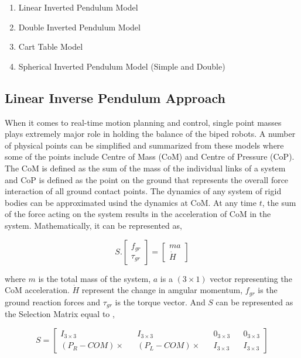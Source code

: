 \begin{enumerate}
    \item Linear Inverted Pendulum Model
    \item Double Inverted Pendulum Model
    \item Cart Table Model
    \item Spherical Inverted Pendulum Model (Simple and Double)
\end{enumerate}


\subsection{Linear Inverse Pendulum Approach}

When it comes to real-time motion planning and control, single point masses plays extremely major role in holding the balance of the biped robots. A number of physical points can be simplified and summarized from 
these models where some of the points include Centre of Mass (CoM) and Centre of Pressure (CoP). The CoM is defined as the sum of the mass of the individual links of a system and CoP is defined as the point on the 
ground that represents the overall force interaction of all ground contact points. The dynamics of any system of rigid bodies can be approximated usind the dynamics at CoM. At any time $t$, the sum of the force acting 
on the system results in the acceleration of CoM in the system. Mathematically, it can be represented as,


\begin{equation}
    S.\begin{bmatrix}
        f_{gr} \\
        \tau_{gr}
    \end{bmatrix} = 
    \begin{bmatrix}
        ma \\
        \dot{H}
    \end{bmatrix}
\end{equation}


where $m$ is the total mass of the system, $a$ is a $(3 \times 1)$ vector representing the CoM acceleration. $\dot{H}$ represent the change in amgular momentum, $f_{gr}$ is the ground reaction forces and $\tau_{gr}$ is the torque vector. And $S$ can be represented as the 
Selection Matrix equal to \cite{elhasairi2015humanoid}, 


\begin{equation}
    S = \begin{bmatrix}
        I_{3 \times 3} && I_{3 \times 3} && 0_{3 \times 3} && 0_{3 \times 3} \\
        (P_R - COM)\times && (P_L - COM)\times && I_{3 \times 3} && I_{3 \times 3}
    \end{bmatrix}
\end{equation}

